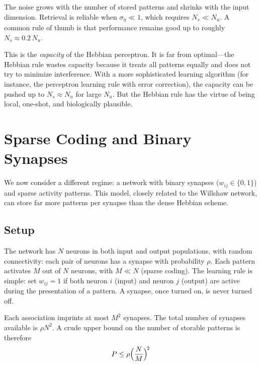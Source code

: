 \noindent The noise grows with the number of stored patterns and shrinks with the input dimension. Retrieval is reliable when $\sigma_\eta \ll 1$, which requires $N_s \ll N_u$. A common rule of thumb is that performance remains good up to roughly $N_s \approx 0.2\,N_u$.

This is the \emph{capacity} of the Hebbian perceptron. It is far from optimal---the Hebbian rule wastes capacity because it treats all patterns equally and does not try to minimize interference. With a more sophisticated learning algorithm (for instance, the perceptron learning rule with error correction), the capacity can be pushed up to $N_s \approx N_u$ for large $N_u$. But the Hebbian rule has the virtue of being local, one-shot, and biologically plausible.

\section{Sparse Coding and Binary Synapses}
\label{sec:sparse}

We now consider a different regime: a network with binary synapses ($w_{ij} \in \{0, 1\}$) and sparse activity patterns. This model, closely related to the Willshaw network, can store far more patterns per synapse than the dense Hebbian scheme.

\subsection{Setup}

The network has $N$ neurons in both input and output populations, with random connectivity: each pair of neurons has a synapse with probability $\rho$. Each pattern activates $M$ out of $N$ neurons, with $M \ll N$ (sparse coding). The learning rule is simple: set $w_{ij} = 1$ if both neuron $i$ (input) and neuron $j$ (output) are active during the presentation of a pattern. A synapse, once turned on, is never turned off.

Each association imprints at most $M^2$ synapses. The total number of synapses available is $\rho N^2$. A crude upper bound on the number of storable patterns is therefore
%
\begin{equation}
  P \leq \rho\Bigl(\frac{N}{M}\Bigr)^{\!2}
  \label{eq:sparse-capacity}
\end{equation}


